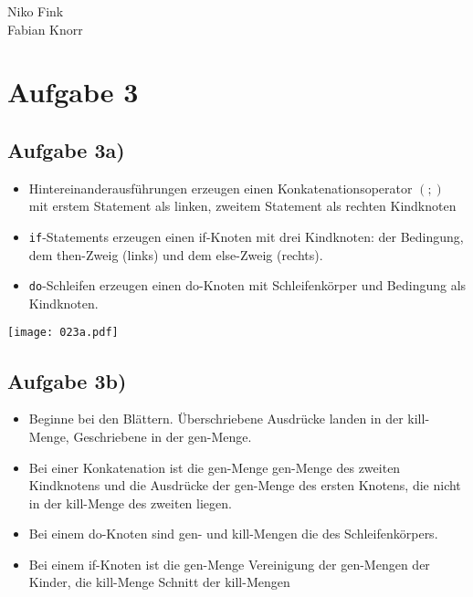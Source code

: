 \documentclass[a4paper,10pt]{article}
\begin{document}
\begin{flushright}
    Niko Fink\\
    Fabian Knorr
\end{flushright}
\vspace*{-5.5em}

\section*{Aufgabe 3}
\subsection*{Aufgabe 3a)}

\begin{itemize}
    \item Hintereinanderausführungen erzeugen einen Konkatenationsoperator $(;)$ mit
        erstem Statement als linken, zweitem Statement als rechten Kindknoten
    \item \texttt{if}-Statements erzeugen einen if-Knoten mit drei Kindknoten:
        der Bedingung, dem then-Zweig (links) und dem else-Zweig (rechts).
    \item \texttt{do}-Schleifen erzeugen einen do-Knoten mit Schleifenkörper und
        Bedingung als Kindknoten.
\end{itemize}

\begin{center}
\texttt{[image: 023a.pdf]}
\end{center}

\newpage
\subsection*{Aufgabe 3b)}

\begin{itemize}
    \item Beginne bei den Blättern. Überschriebene Ausdrücke landen in der kill-Menge,
        Geschriebene in der gen-Menge.
    \item Bei einer Konkatenation ist die gen-Menge gen-Menge des zweiten Kindknotens
        und die Ausdrücke der gen-Menge des ersten Knotens, die nicht in der kill-Menge
        des zweiten liegen.
    \item Bei einem do-Knoten sind gen- und kill-Mengen die des Schleifenkörpers.
    \item Bei einem if-Knoten ist die gen-Menge Vereinigung der gen-Mengen der Kinder,
        die kill-Menge Schnitt der kill-Mengen
\end{itemize}
\end{document}
